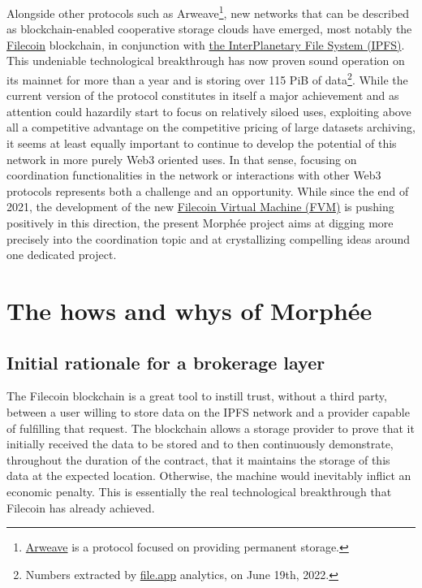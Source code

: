 \documentclass[twoside,twocolumn]{article}
\begin{document}
Alongside other protocols such as Arweave\footnote{\href{https://www.arweave.org/}{Arweave}
is a protocol focused on providing permanent storage.},
new networks that can be described as blockchain-enabled cooperative storage clouds have emerged,
most notably the \href{https://filecoin.io/}{Filecoin} blockchain, in conjunction with
\href{https://ipfs.io/}{the InterPlanetary File System (IPFS)}.
This undeniable technological breakthrough has now proven sound operation on its mainnet for more than a year and is storing
over 115 PiB of data\footnote{Numbers extracted by \href{https://file.app/}{file.app} analytics, on June 19th, 2022.}.
While the current version of the protocol constitutes in itself a major achievement and as attention could hazardily start to focus on relatively siloed uses,
exploiting above all a competitive advantage on the competitive pricing of large datasets archiving,
it seems at least equally important to continue to develop the potential of this network in more purely Web3 oriented uses.
In that sense, focusing on coordination functionalities in the network or interactions with other Web3 protocols represents both a challenge and an opportunity.
While since the end of 2021, the development of the new \href{https://fvm.filecoin.io/}{Filecoin Virtual Machine (FVM)} is pushing positively in this direction,
the present Morphée project aims at digging more precisely into the coordination topic and at crystallizing compelling ideas around one dedicated project.


\section{The hows and whys of Morphée}

\subsection{Initial rationale for a brokerage layer}

The Filecoin blockchain is a great tool to instill trust, without a third party,
between a user willing to store data on the IPFS network and a provider capable of fulfilling that request.
The blockchain allows a storage provider to prove that it initially received the data to be stored and to then continuously demonstrate,
throughout the duration of the contract, that it maintains the storage of this data at the expected location.
Otherwise, the machine would inevitably inflict an economic penalty.
This is essentially the real technological breakthrough that Filecoin has already achieved.
\end{document}

